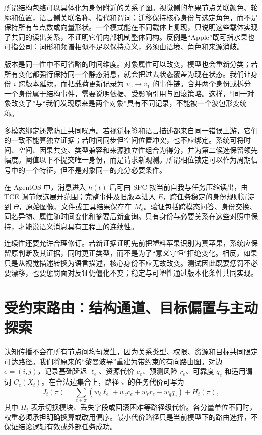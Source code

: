 所谓结构包络可以具体化为身份附近的关系子图。视觉侧的苹果节点关联颜色、轮廓和位置，语言侧关联名称、指代和谓词；迁移保持核心身份与选定角色，而不是保持所有节点数或向量形状。一个模式能在不同载体上复现，只说明这些载体实现了共同的读出关系，不证明它们内部机制整体同构。反例是“Apple”既可指水果也可指公司：词形和频谱相似不足以保持意义，必须由语境、角色和来源消歧。

版本是同一性中不可省略的时间维度。对象属性可以改变，模型也会重新分类；若所有变化都强行保持同一个静态消息，就会把过去状态覆盖为现在状态。我们让身份 $i$ 跨版本延续，而把载荷更新记录为 $v_0\to v_1$ 的事件链。合并两个身份或拆分一个身份属于结构事件，需要说明依据、受影响引用与回滚策略。这样，“同一对象改变了”与“我们发现原来是两个对象”具有不同记录，不能被一个波包形变统称。

多模态绑定还需防止共同噪声。若视觉标签和语言描述都来自同一错误上游，它们的一致不能算独立证据；若时间同步但空间位置冲突，也不应绑定。系统可将时间、空间、因果共变、类型兼容和来源独立性组合为得分，并为第二候选保留领先幅度。阈值以下不提交唯一身份，而是请求新观测。所谓相位锁定可以作为周期信号中的一个特征，但不是对象同一的充分必要条件。

在 AgentOS 中，消息进入 $h(t)$ 后可由 SPC 按当前自我与任务压缩读出，由 TCE 调节候选展开范围；完整事件及旧版本进入 $E$，跨任务稳定的身份规则沉淀到 $\Theta$，原始图像、文件或工具结果保存在 $M_e$。验证包括跨模态问答、身份交换、同名异物、属性随时间变化和摘要后新查询。只有身份与必要关系在这些对照中保持，才能说语义消息具有工程上的连续性。

连续性还要允许合理修订。若新证据证明先前把塑料苹果识别为真苹果，系统应保留原判断及其证据，同时更正类型，而不是为了“意义守恒”拒绝变化。相反，如果只是从视觉描述转换为语言描述，核心身份不应无故改变。测试因此既要惩罚不必要漂移，也要惩罚面对反证仍僵化不变；稳定与可塑性通过版本化条件共同实现。

\section{受约束路由：结构通道、目标偏置与主动探索}
\label{sec:riemannian_waveguide}

认知传播不会在所有节点间均匀发生，因为关系类型、权限、资源和目标共同限定可达路径。我们将原来的“黎曼波导”重建为带约束的有向路由图。对边 $e=(i,j)$，记录基础延迟 $\ell_e$、资源代价 $c_e$、预测风险 $r_e$、可靠度 $q_e$ 和适用谓词 $C_e(X_t)$。在合法边集合上，路径 $\pi$ 的任务代价可写为
\begin{equation}
J_t(\pi)=\sum_{e\in\pi}\left(w_\ell\ell_e+w_c c_e+w_r r_e-w_q q_e\right)+H_t(\pi),
\end{equation}
其中 $H_t$ 表示切换模块、丢失字段或回滚困难等路径级代价。各分量单位不同时，权重必须承担明确换算或改用偏序。最小代价路径只是当前模型下的路由选择，不保证结论逻辑有效或外部任务成功。

